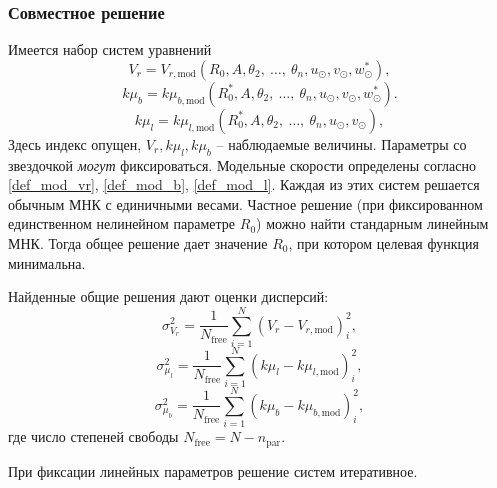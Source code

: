 \documentclass{matmex-diploma-custom}
\begin{document}
\subsubsection{Совместное решение} \label{united_mod}
Имеется набор систем уравнений
\begin{equation} \label{v_r_sys}
                V_r = V_{r, \mathrm{mod}} (R_0, A, \theta_2, \:\ldots,\: \theta_n, u_{\odot}, v_{\odot}, w_{\odot}^{*}),
	\end{equation}
        \begin{equation} \label{b_sys}
                k\mu_b = k\mu_{b, \mathrm{mod}} (R_0^{*}, A, \theta_2, \:\ldots,\: \theta_n, u_{\odot}, v_{\odot}, w_{\odot}^{*}).
	\end{equation}
        \begin{equation} \label{l_sys}
                k\mu_l = k\mu_{l, \mathrm{mod}} (R_0^{*}, A, \theta_2, \:\ldots,\: \theta_n, u_{\odot}, v_{\odot}),
	\end{equation}
        Здесь индекс опущен, $V_r, k\mu_l, k\mu_b$ -- наблюдаемые величины. Параметры со звездочкой \textit{могут} фиксироваться. Модельные скорости определены согласно \ref{def_mod_vr}, \ref{def_mod_b}, \ref{def_mod_l}. Каждая из этих систем решается обычным МНК с единичными весами. Частное решение (при фиксированном единственном нелинейном параметре $R_0$) можно найти стандарным линейным МНК. Тогда общее решение дает значение $R_0$, при котором целевая функция минимальна. 
\par Найденные общие решения дают оценки дисперсий:
	\begin{equation}
                \sigma^2_{V_r} = \frac{1}{N_{\mathrm{free}}} \sum^N_{i = 1} \left( V_r - V_{r, \mathrm{mod}} \right)^2_i,
	\end{equation}
	\begin{equation}
                \sigma^2_{\mu_l} = \frac{1}{N_{\mathrm{free}}} \sum^N_{i = 1} \left( k\mu_l - k\mu_{l, \mathrm{mod}} \right)^2_i,
	\end{equation}
	\begin{equation}
                \sigma^2_{\mu_b} = \frac{1}{N_{\mathrm{free}}} \sum^N_{i = 1} \left( k\mu_b - k\mu_{b, \mathrm{mod}} \right)^2_i,
	\end{equation}
        где число степеней свободы $N_{\mathrm{free}} = N - n_{\mathrm{par}}$.

При фиксации линейных параметров решение систем итеративное. 
\end{document}

